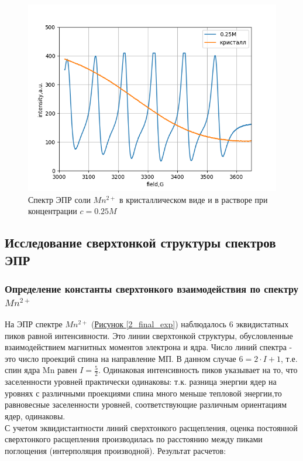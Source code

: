 \documentclass{article}
\begin{document}
\begin{figure}[h!]
        \centering
        \includegraphics[scale = 0.7]{2_sold.png}
        \caption{Спектр ЭПР соли $Mn^{2+}$ в кристаллическом виде и в растворе при концентрации $c = 0.25 M$}
        \label{2_sold}
    \end{figure}

\subsection{Исследование сверхтонкой структуры спектров ЭПР}

\subsubsection{Определение константы сверхтонкого взаимодействия по спектру $Mn^{2+}$}
На ЭПР спектре $Mn^{2+}$ (\hyperref[2_final_exp]{Рисунок \ref*{2_final_exp}}) наблюдалось 6 эквидистатных пиков равной интенсивности. Это линии сверхтонкой структуры, обусловленные взаимодействием магнитных моментов электрона и ядра. Число линий спектра - это число проекций спина на направление МП. В данном случае $6=2\cdot I + 1$, т.е. спин ядра Mn равен $I=\frac{5}{2}$. Одинаковая интенсивность пиков указывает на то, что заселенности уровней практически одинаковы: т.к. разница энергии ядер на уровнях с различными проекциями спина много меньше тепловой энергии,то  равновесные заселенности уровней, соответствующие различным
ориентациям ядер, одинаковы.\\
С учетом эквидистантности линий сверхтонкого расщепления, оценка постоянной сверхтонкого расщепления производилась по расстоянию между пиками поглощения (интерполяция производной). Результат расчетов:
\end{document}
